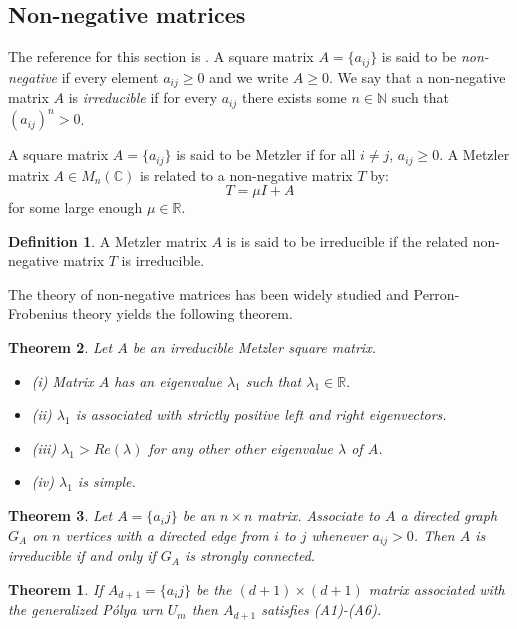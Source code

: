 \documentclass[oneside]{book} %
\newtheorem{theorem}{Theorem}
\newtheorem{thm}{Theorem}[section]
\theoremstyle{definition}
\newtheorem{defn}[thm]{Definition}
\numberwithin{equation}{section}
\begin{document}
\subsection{Non-negative matrices}
The reference for this section is \cite{Nonnegative matrices and Markov Chains}.
A square matrix $A = \{a_{ij}\}$ is said to be \emph{non-negative} if every element $a_{ij} \geq 0$ and we write $A \geq 0$.  We say that a non-negative matrix $A$ is \emph{irreducible} if for every $a_{ij}$ there exists some $n \in \mathbb{N}$ such that $(a_{ij})^n > 0$. 

A square matrix $A=\{a_{ij}\}$ is said to be Metzler if for all $i \neq j$, $a_{ij} \geq 0$. A Metzler matrix $A \in M_{n}(\mathbb{C})$ is related to a non-negative matrix $T$ by:
\[T = \mu I + A\]
for some large enough $\mu \in \mathbb{R}$.

\begin{defn}\label{defn:Met}
 A Metzler matrix $A$ is is said to be irreducible if the related non-negative matrix $T$ is irreducible.
\end{defn}

The theory of non-negative matrices has been widely studied and Perron-Frobenius theory yields the following theorem.

\begin{thm}\label{thm:ev}
 Let $A$ be an irreducible Metzler square matrix.  
 \begin{itemize}
  \item(i) Matrix $A$ has an eigenvalue $\lambda_1$ such that $\lambda_1 \in \mathbb{R}.$
  \item(ii) $\lambda_1$ is associated with strictly positive left and right eigenvectors.
  \item(iii) $\lambda_1 > Re(\lambda)$ for any other other eigenvalue $\lambda$ of $A$. 
  \item(iv) $\lambda_{1}$ is simple.
 \end{itemize}
\end{thm}

\begin{thm}\cite{addcitation:applied graph theory - wai-kai chen}\label{thm:gt}
 Let $A = \{a_ij\}$ be an $n \times n$ matrix.  Associate to $A$ a directed graph $G_A$ on $n$ vertices with a directed edge from $i$ to $j$ whenever $ a_{ij}>0$.  Then $A$ is irreducible if and only if $G_A$ is strongly connected.
\end{thm}



\begin{theorem}\label{thm:A1}
If $A_{d+1} = \{a_ij\}$ be the $(d+1) \times (d+1)$ matrix associated with the generalized P\'{o}lya urn $U_m$ then $A_{d+1}$ satisfies (A1)-(A6). 
\end{theorem}
\end{document}
